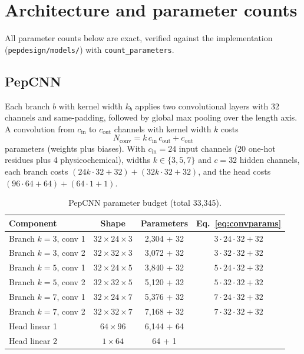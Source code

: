 
\section{Architecture and parameter counts}\label{app:arch}
All parameter counts below are exact, verified against the implementation
(\texttt{pepdesign/models/}) with \texttt{count\_parameters}.

\subsection{PepCNN}
Each branch $b$ with kernel width $k_b$ applies two convolutional layers
with 32 channels and same-padding, followed by global max pooling over the
length axis. A convolution from $c_{\mathrm{in}}$ to $c_{\mathrm{out}}$
channels with kernel width $k$ costs
\begin{equation}
N_{\mathrm{conv}} = k\, c_{\mathrm{in}}\, c_{\mathrm{out}} + c_{\mathrm{out}}
\label{eq:convparams}
\end{equation}
parameters (weights plus biases). With $c_{\mathrm{in}} = 24$ input
channels (20 one-hot residues plus 4 physicochemical), widths
$k \in \{3,5,7\}$ and $c = 32$ hidden channels, each branch costs
$(24k \cdot 32 + 32) + (32k \cdot 32 + 32)$, and the head costs
$(96 \cdot 64 + 64) + (64 \cdot 1 + 1)$.

\begin{table}[h]\centering\small
\caption{PepCNN parameter budget (total 33{,}345).}
\label{tab:cnnparams}
\begin{tabular}{lccc}
\hline
Component & Shape & Parameters & Eq.~\eqref{eq:convparams} \\
\hline
Branch $k{=}3$, conv 1 & $32 \times 24 \times 3$ & 2{,}304 + 32 & $3\cdot24\cdot32+32$ \\
Branch $k{=}3$, conv 2 & $32 \times 32 \times 3$ & 3{,}072 + 32 & $3\cdot32\cdot32+32$ \\
Branch $k{=}5$, conv 1 & $32 \times 24 \times 5$ & 3{,}840 + 32 & $5\cdot24\cdot32+32$ \\
Branch $k{=}5$, conv 2 & $32 \times 32 \times 5$ & 5{,}120 + 32 & $5\cdot32\cdot32+32$ \\
Branch $k{=}7$, conv 1 & $32 \times 24 \times 7$ & 5{,}376 + 32 & $7\cdot24\cdot32+32$ \\
Branch $k{=}7$, conv 2 & $32 \times 32 \times 7$ & 7{,}168 + 32 & $7\cdot32\cdot32+32$ \\
Head linear 1 & $64 \times 96$ & 6{,}144 + 64 & \\
Head linear 2 & $1 \times 64$ & 64 + 1 & \\
\hline
\end{tabular}
\end{table}

